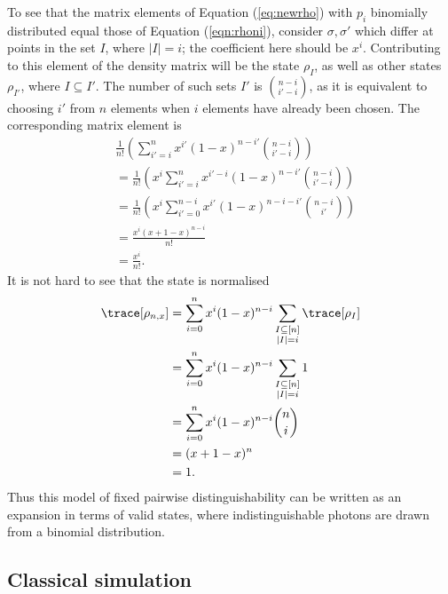 To see that the matrix elements of Equation (\ref{eq:newrho}) with $p_i$ binomially distributed equal those of Equation (\ref{eqn:rhoni}), consider  $\sigma,\sigma'$ which differ at points in the set $I$, where $|I|=i$; the coefficient here should be $x^i$.
Contributing to this element of the density matrix will be the state $\rho_I$, as well as other states $\rho_{I'}$, where $I \subseteq I'$. 
The number of such sets $I'$ is $\binom{n-i}{i'-i}$, as it is equivalent to choosing $i'$ from $n$ elements when $i$ elements have already been chosen. 
The corresponding matrix element is
\begin{align}
&\frac{1}{n!}\left(\sum_{{i'}=i}^n x^{i'}(1-x)^{n-{i'}}\binom{n-i}{{i'}-i}\right) \\
&= \frac{1}{n!}\left(x^i\sum_{{i'}=i}^n x^{{i'}-i}(1-x)^{n-{i'}}\binom{n-i}{{i'}-i}\right)\\
&= \frac{1}{n!}\left( x^i\sum_{{i'}=0}^{n-i}x^{i'}(1-x)^{n-i-{i'}}\binom{n-i}{{i'}}\right)\\
&= \frac{x^i(x + 1 - x)^{n-i}}{n!}\\
&= \frac{x^i}{n!}.
\end{align}
It is not hard to see that the state is normalised
\begin{align}
\trace[\rho_{n,x}] &= \sum_{i=0}^nx^i(1-x)^{n-i}\sum_{\substack{I\subseteq[n]\\|I|=i}}\trace[\rho_I]\\
&= \sum_{i=0}^nx^i(1-x)^{n-i}\sum_{\substack{I\subseteq[n]\\|I|=i}}1\\
&= \sum_{i=0}^nx^i(1-x)^{n-i}\binom{n}{i}\\
&= (x + 1 - x)^n\\
&= 1.
\end{align}
Thus this model of fixed pairwise distinguishability can be written as an expansion in terms of valid states, where indistinguishable photons are drawn from a binomial distribution.


\subsection{Classical simulation} %

